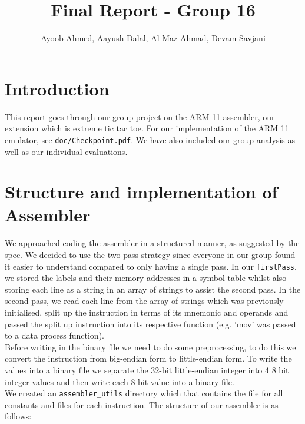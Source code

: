 \documentclass[11pt]{article}
\begin{document}
\title{\vspace{-2cm}Final Report - Group 16}
\author{Ayoob Ahmed, Aayush Dalal, Al-Maz Ahmad, Devam Savjani}


\maketitle
\section{Introduction}
This report goes through our group project on the ARM 11 assembler, our extension which is extreme tic tac toe. For our implementation of the ARM 11 emulator, see {\tt{doc/Checkpoint.pdf}}. We have also included our group analysis as well as our individual evaluations.

\section{Structure and implementation of Assembler}
We approached coding the assembler in a structured manner, as suggested by the spec. We decided to use the two-pass strategy since everyone in our group found it easier to understand compared to only having a single pass. In our {\tt{firstPass}}, we stored the labels and their memory addresses in a symbol table whilst also storing each line as a string in an array of strings to assist the second pass. In the second pass, we read each line from the array of strings which was previously initialised, split up the instruction in terms of its mnemonic and operands and passed the split up instruction into its respective function (e.g. 'mov' was passed to a data process function).
\\Before writing in the binary file we need to do some preprocessing, to do this we convert the instruction from big-endian form to little-endian form. To write the values into a binary file we separate the 32-bit little-endian integer into 4 8 bit integer values and then write each 8-bit value into a binary file.
\\ We created an {\tt{assembler\_utils}} directory which that contains the file for all constants and files for each instruction. The structure of our assembler is as follows:
\end{document}
